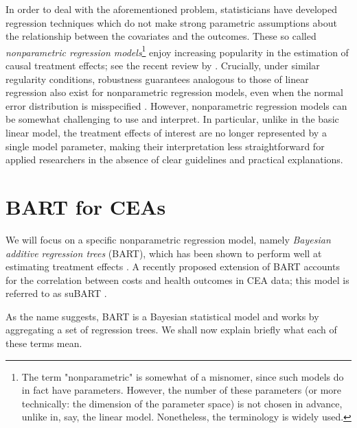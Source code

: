 \documentclass[aoas,preprint]{imsart}
\theoremstyle{plain}
\theoremstyle{definition}
\theoremstyle{remark}
\theoremstyle{remark}
\begin{document}
In order to deal with the aforementioned problem, statisticians have developed regression techniques which do not make strong parametric assumptions about the relationship between the covariates and the outcomes. These so called \emph{nonparametric regression models}\footnote{The term "nonparametric" is somewhat of a misnomer, since such models do in fact have parameters. However, the number of these parameters (or more technically: the dimension of the parameter space) is not chosen in advance, unlike in, say, the linear model. Nonetheless, the terminology is widely used.} enjoy increasing popularity in the estimation of causal treatment effects; see the recent review by \citet{caron2022estimating}. Crucially, under similar regularity conditions, robustness guarantees analogous to those of linear regression  also exist for nonparametric regression models, even when the normal error distribution is misspecified \citep{kleijn2006misspecification}.
However, nonparametric regression models can be somewhat challenging to use and interpret. In particular, unlike in the basic linear model, the treatment effects of interest are no longer represented by a single model parameter, making their interpretation less straightforward for applied researchers in the absence of clear guidelines and practical explanations.

\section{BART for CEAs}
We will focus on a specific nonparametric regression model, namely \emph{Bayesian additive regression trees} (BART), which has been shown to perform well at estimating treatment effects  \citep{dorie2019automated}. 
A recently proposed extension of BART accounts for the correlation between costs and health outcomes in CEA data; this model is referred to as suBART \citep{esser2025seemingly}.

As the name suggests, BART is a Bayesian statistical model and works by aggregating a set of regression trees. We shall now explain briefly what each of these terms mean. 
\end{document}
